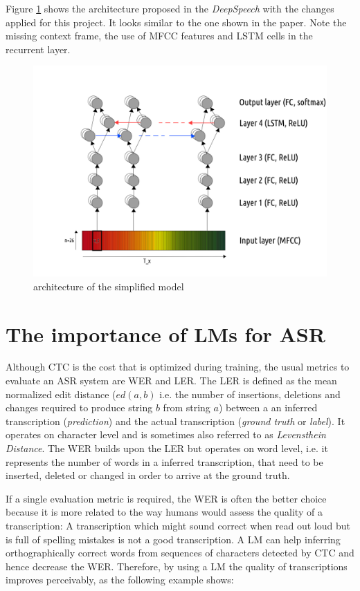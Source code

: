 Figure \ref{model_architecture} shows the architecture proposed in the \textit{DeepSpeech} with the changes applied for this project. It looks similar to the one shown in the paper. Note the missing context frame, the use of \ac{MFCC} features and \ac{LSTM} cells in the recurrent layer.

\begin{figure}
	\includegraphics[width=\linewidth]{./img/model_architecture.png}
	\caption{architecture of the simplified model}
	\label{model_architecture}
\end{figure}


\section{The importance of \ac{LM}s for \ac{ASR}}

Although \ac{CTC} is the cost that is optimized during training, the usual metrics to evaluate an \ac{ASR} system are \ac{WER} and \ac{LER}. The \ac{LER} is defined as the mean normalized edit distance ($ed(a, b)$ i.e. the number of insertions, deletions and changes required to produce string $b$ from string $a$) between a an inferred transcription (\textit{prediction}) and the actual transcription (\textit{ground truth} or \textit{label}). It operates on character level and is sometimes also referred to as \textit{Levensthein Distance}. The \ac{WER} builds upon the \ac{LER} but operates on word level, i.e. it represents the number of words in a inferred transcription, that need to be inserted, deleted or changed in order to arrive at the ground truth.

If a single evaluation metric is required, the \ac{WER} is often the better choice because it is more related to the way humans would assess the quality of a transcription: A transcription which might sound correct when read out loud but is full of spelling mistakes is not a good transcription. A \ac{LM} can help inferring orthographically correct words from sequences of characters detected by \ac{CTC} and hence decrease the \ac{WER}. Therefore, by using a \ac{LM} the quality of transcriptions improves perceivably, as the following example shows:

